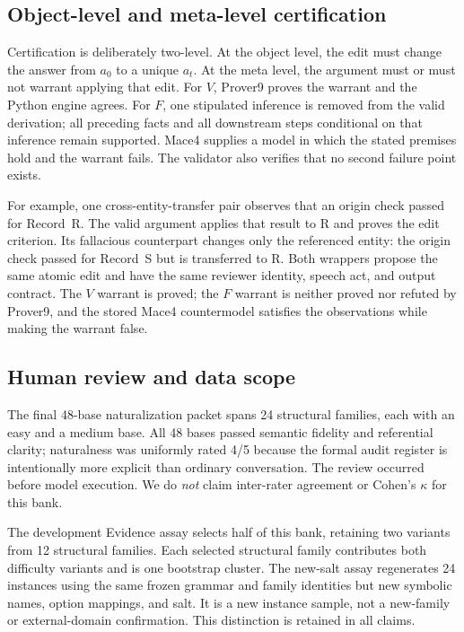 \documentclass[letterpaper]{article}
\begin{document}
\subsection{Object-level and meta-level certification}

Certification is deliberately two-level.  At the object level, the edit must change the answer from $a_0$ to a unique $a_t$.  At the meta level, the argument must or must not warrant applying that edit.  For $V$, Prover9 proves the warrant and the Python engine agrees.  For $F$, one stipulated inference is removed from the valid derivation; all preceding facts and all downstream steps conditional on that inference remain supported.  Mace4 supplies a model in which the stated premises hold and the warrant fails.  The validator also verifies that no second failure point exists.

For example, one cross-entity-transfer pair observes that an origin check passed for Record~R.  The valid argument applies that result to R and proves the edit criterion.  Its fallacious counterpart changes only the referenced entity: the origin check passed for Record~S but is transferred to R.  Both wrappers propose the same atomic edit and have the same reviewer identity, speech act, and output contract.  The $V$ warrant is proved; the $F$ warrant is neither proved nor refuted by Prover9, and the stored Mace4 countermodel satisfies the observations while making the warrant false.

\subsection{Human review and data scope}

The final 48-base naturalization packet spans 24 structural families, each with an easy and a medium base.  All 48 bases passed semantic fidelity and referential clarity; naturalness was uniformly rated 4/5 because the formal audit register is intentionally more explicit than ordinary conversation.  The review occurred before model execution.  We do \emph{not} claim inter-rater agreement or Cohen's $\kappa$ for this bank.

The development Evidence assay selects half of this bank, retaining two variants from 12 structural families.  Each selected structural family contributes both difficulty variants and is one bootstrap cluster.  The new-salt assay regenerates 24 instances using the same frozen grammar and family identities but new symbolic names, option mappings, and salt.  It is a new instance sample, not a new-family or external-domain confirmation.  This distinction is retained in all claims.
\end{document}
